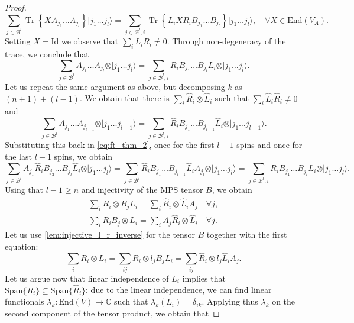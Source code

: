 \documentclass{article}
\newcommand{\tr}{\operatorname{Tr}}
\newcommand{\id}{\mathrm{Id}}
\newcommand{\End}{\mathrm{End}}
\newcommand{\ket}[1]{\vert #1 \rangle}
\newcommand{\Span}{\mathrm{Span}}
\begin{document}
\begin{proof}
  \begin{equation*}
    \sum_{j\in\mathcal{B}^l} \tr\left\{X A_{j_1} \dots A_{j_l}\right\} \ket{j_1 \dots j_l}= 
    \sum_{j\in\mathcal{B}^l,i} \tr\left\{L_i X R_i B_{j_1} \dots B_{j_l}\right\} \ket{j_1 \dots j_l}, \quad \forall X\in \End(V_A).
  \end{equation*}
  Setting $X=\id$ we observe that $\sum_i L_i R_i\neq 0$. Through non-degeneracy of the trace, we conclude that
  \begin{equation}\label{eq:ft_thm_2}
    \sum_{j\in\mathcal{B}^l}  A_{j_1} \dots A_{j_l} \otimes  \ket{j_1 \dots j_l}= 
    \sum_{j\in\mathcal{B}^l,i}  R_i B_{j_1} \dots B_{j_l}L_i \otimes \ket{j_1 \dots j_l}.
  \end{equation}
  Let us repeat the same argument as above, but decomposing $k$ as $(n+1)+(l-1)$. We obtain that there is $\sum_i \hat R_i \otimes \hat L_i$ such that $\sum_i \hat L_i \hat R_i \neq 0$ and    
  \begin{equation*}
    \sum_{j\in\mathcal{B}^l}  A_{j_1} \dots A_{j_{l-1}} \otimes  \ket{j_1 \dots j_{l-1}}= 
    \sum_{j\in\mathcal{B}^l,i}  \hat R_i B_{j_1} \dots  B_{j_{l-1}} \hat L_i \otimes \ket{j_1 \dots j_{l-1}}.
  \end{equation*}
  Substituting this back in \cref{eq:ft_thm_2}, once for the first $l-1$ spins and once for the last $l-1$ spins, we obtain
  \begin{equation*}
      \sum_{j\in\mathcal{B}^l}  A_{j_1} \hat R_i B_{j_2} \dots B_{j_l} \hat L_i  \otimes  \ket{j_1 \dots j_l}= 
    \sum_{j\in\mathcal{B}^l}  \hat R_i B_{j_1} \dots B_{j_{l-1}} \hat L_i A_{j_l} \otimes  \ket{j_1 \dots j_l}= 
      \sum_{j\in\mathcal{B}^l,i}  R_i B_{j_1} \dots B_{j_l}L_i \otimes \ket{j_1 \dots j_l}.
  \end{equation*}
  Using that $l-1\geq n$ and injectivity of the MPS tensor $B$, we obtain
  \begin{align}
    \sum_i R_i \otimes B_j L_i = \sum_i \hat R_i \otimes \hat L_i A_j \quad \forall j, \label{eq:ft_LR1}\\
    \sum_i R_i B_j \otimes L_i = \sum_i A_j \hat R_i \otimes \hat L_i \quad \forall j \label{eq:ft_LR2}.
  \end{align}
  Let us use \cref{lem:injective_l_r_inverse} for the tensor $B$ together with the first equation:
  \begin{equation*}
     \sum_{i} R_i \otimes L_i =  \sum_{ij} R_i \otimes l_jB_j L_i = \sum_{ij} \hat R_i \otimes l_j\hat L_i A_j.
  \end{equation*}
  Let us argue now that linear independence of $L_i$ implies that $\Span\{R_i\} \subseteq \Span\{\hat R_i\}$: due to the linear independence, we can find linear functionals $\lambda_k: \End(V)\to \mathbb{C}$ such that $\lambda_k(L_i) = \delta_{ik}$. Applying thus $\lambda_k$ on the second component of the tensor product, we obtain that 

\end{proof}
\end{document}
